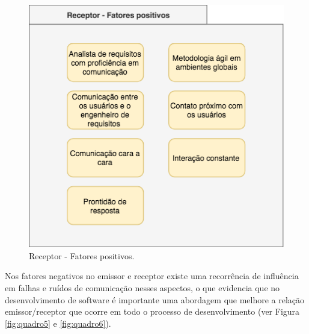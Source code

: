 \begin{figure}[h!] %
	\begin{center}
	
	\caption{Receptor - Fatores positivos.}
		\label{fig:quadroneg}
	    \includegraphics[scale=0.6]{figuras/quadro4} %
	\end{center}

\end{figure}

Nos fatores negativos no emissor e receptor existe uma recorrência de influência em falhas e ruídos de comunicação nesses aspectos, o que evidencia que no desenvolvimento de software é importante uma abordagem que melhore a relação emissor/receptor que ocorre em todo o processo de desenvolvimento (ver Figura \ref{fig:quadro5} e \ref{fig:quadro6}).

